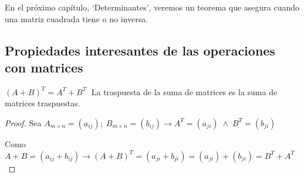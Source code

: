 En el próximo capítulo, `Determinantes', veremos un teorema que asegura cuando una matriz cuadrada tiene o no inversa.

\subsection{Propiedades interesantes de las operaciones con matrices}

\begin{lema}
\label{lema1}\label{producto-traspuestas}

$(A+B)^T=A^T + B^T\; $ La traspuesta de la suma de matrices es la suma de matrices traspuestas.
\end{lema}
\begin{proof}

Sea $A_{m\times n}=(a_{ij}); \; B_{m \times n}=(b_{ij}) \to A^T=(a_{ji})\; \wedge \; B^T=(b_{ji})$

Como $A+B=	(a_{ij}+b_{ij}) \to (A+B)^T=(a_{ji}+b_{ji})=(a_{ji}) + (b_{ji})=B^T+A^T$ 

\end{proof}



